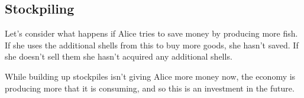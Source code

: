 
\subsection{Stockpiling}

Let’s consider what happens if Alice tries to save money by producing more fish. If she uses the additional shells from this to buy more goods, she hasn’t saved. If she doesn’t sell them she hasn’t acquired any additional shells.

While building up stockpiles isn’t giving Alice more money now, the economy is producing more that it is consuming, and so this is an investment in the future.

